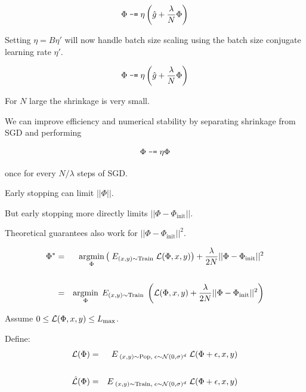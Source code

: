 {

{\color{red} $$\Phi \;\mbox{\tt -=}\; \eta\left(\hat{g} +\frac{\lambda}{N}\Phi\right)$$}

\vfill
Setting {\color{red} $\eta = B\eta'$} will now handle batch size scaling using the batch size conjugate learning rate {\color{red} $\eta'$}.


{\color{red} $$\Phi \;\mbox{\tt -=}\; \eta\left(\hat{g} +\frac{\lambda}{N}\Phi\right)$$}

\vfill
For $N$ large the shrinkage is very small.

\vfill
We can improve efficiency and numerical stability
by separating shrinkage from SGD and performing

{\color{red} $$\Phi \;\mbox{\tt -=}\; \eta\Phi$$}

\vfill
once for every $N/\lambda$ steps of SGD.


Early stopping can limit $||\Phi||$.

\vfill
But early stopping more directly limits $||\Phi - \Phi_\mathrm{init}||$.

\vfill
Theoretical guarantees also work for $||\Phi - \Phi_{\mathrm{init}}||^2$.



{\color{red}
\begin{eqnarray*}
\Phi^* & = & \operatorname*{argmin}_\Phi \left(\;E_{(x,y) \sim \mathrm{Train}}\;{\cal L}(\Phi,x,y)\right) + \frac{\lambda}{2N}||\Phi-\Phi_{\mathrm{init}}||^2 \\
\\
& = & \operatorname*{argmin}_\Phi\;E_{(x,y) \sim \mathrm{Train}}\;\left({\cal L}(\Phi,x,y) + \frac{\lambda}{2N}||\Phi-\Phi_{\mathrm{init}}||^2\right)
\end{eqnarray*}
}


Assume $0 \leq {\cal L}(\Phi,x,y) \leq L_{\max}$.

\vfill
Define:
\begin{eqnarray*}
{\cal L}(\Phi) & = & E_{\;(x,y)\sim \mathrm{Pop},\;\epsilon \sim {\cal N}(0,\sigma)^d}\;{{\cal L}(\Phi+\epsilon,x,y)} \\
\\
\hat{{\cal L}}(\Phi) & = & E_{\;(x,y)\sim \mathrm{Train},\;\epsilon \sim {\cal N}(0,\sigma)^d}\;{{\cal L}(\Phi+\epsilon,x,y)} \\
\end{eqnarray*}

}

